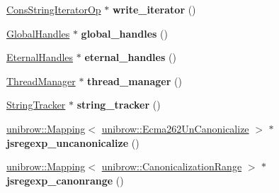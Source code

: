 \begin{DoxyCompactItemize}
\item 
\hypertarget{classv8_1_1internal_1_1_isolate_ae025d0a2b9ee26758d62729683e7ab2b}{}\hyperlink{classv8_1_1internal_1_1_cons_string_iterator_op}{Cons\+String\+Iterator\+Op} $\ast$ {\bfseries write\+\_\+iterator} ()\label{classv8_1_1internal_1_1_isolate_ae025d0a2b9ee26758d62729683e7ab2b}

\item 
\hypertarget{classv8_1_1internal_1_1_isolate_af83dc55d6b6ac38086fa181d110eeba6}{}\hyperlink{classv8_1_1internal_1_1_global_handles}{Global\+Handles} $\ast$ {\bfseries global\+\_\+handles} ()\label{classv8_1_1internal_1_1_isolate_af83dc55d6b6ac38086fa181d110eeba6}

\item 
\hypertarget{classv8_1_1internal_1_1_isolate_af528177ab1bb312657f39ee64bb19518}{}\hyperlink{classv8_1_1internal_1_1_eternal_handles}{Eternal\+Handles} $\ast$ {\bfseries eternal\+\_\+handles} ()\label{classv8_1_1internal_1_1_isolate_af528177ab1bb312657f39ee64bb19518}

\item 
\hypertarget{classv8_1_1internal_1_1_isolate_aabc2be46fe8930ab6f44538d1eca456b}{}\hyperlink{classv8_1_1internal_1_1_thread_manager}{Thread\+Manager} $\ast$ {\bfseries thread\+\_\+manager} ()\label{classv8_1_1internal_1_1_isolate_aabc2be46fe8930ab6f44538d1eca456b}

\item 
\hypertarget{classv8_1_1internal_1_1_isolate_acf861f7ff7d7ed213e7dfa7c491cc650}{}\hyperlink{classv8_1_1internal_1_1_string_tracker}{String\+Tracker} $\ast$ {\bfseries string\+\_\+tracker} ()\label{classv8_1_1internal_1_1_isolate_acf861f7ff7d7ed213e7dfa7c491cc650}

\item 
\hypertarget{classv8_1_1internal_1_1_isolate_abb16bd94a89f5b53f63733cd88268dd1}{}\hyperlink{classunibrow_1_1_mapping}{unibrow\+::\+Mapping}$<$ \hyperlink{structunibrow_1_1_ecma262_un_canonicalize}{unibrow\+::\+Ecma262\+Un\+Canonicalize} $>$ $\ast$ {\bfseries jsregexp\+\_\+uncanonicalize} ()\label{classv8_1_1internal_1_1_isolate_abb16bd94a89f5b53f63733cd88268dd1}

\item 
\hypertarget{classv8_1_1internal_1_1_isolate_a3c7039fefe33dda66e6029c8d46cdef1}{}\hyperlink{classunibrow_1_1_mapping}{unibrow\+::\+Mapping}$<$ \hyperlink{structunibrow_1_1_canonicalization_range}{unibrow\+::\+Canonicalization\+Range} $>$ $\ast$ {\bfseries jsregexp\+\_\+canonrange} ()\label{classv8_1_1internal_1_1_isolate_a3c7039fefe33dda66e6029c8d46cdef1}


\end{DoxyCompactItemize}
